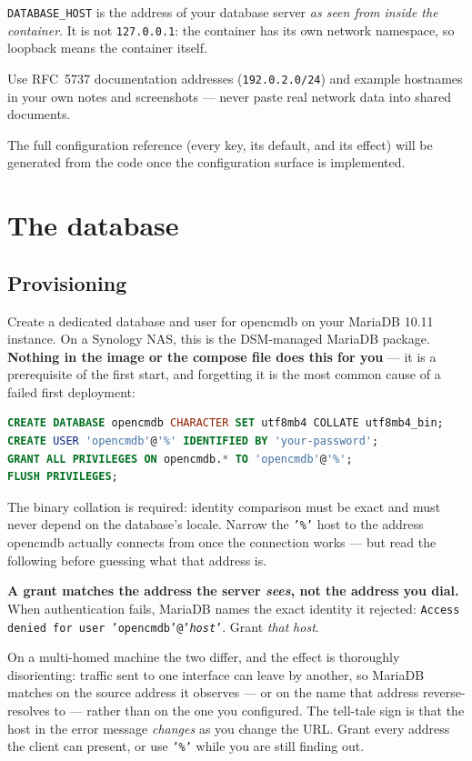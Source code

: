 \documentclass[11pt,oneside,listof=totoc,bibliography=totoc]{scrreprt}
\begin{document}
\begin{warning}
\texttt{DATABASE\_HOST} is the address of your database server \emph{as seen from inside the
container}. It is not \texttt{127.0.0.1}: the container has its own network namespace, so
loopback means the container itself.
\end{warning}

\begin{note}
Use RFC~5737 documentation addresses (\texttt{192.0.2.0/24}) and example hostnames in your
own notes and screenshots — never paste real network data into shared documents.
\end{note}

\begin{planned}
The full configuration reference (every key, its default, and its effect) will be generated
from the code once the configuration surface is implemented.
\end{planned}

\chapter{The database}
\section{Provisioning}
Create a dedicated database and user for opencmdb on your MariaDB 10.11 instance. On a
Synology NAS, this is the DSM-managed MariaDB package. \textbf{Nothing in the image or the
compose file does this for you} --- it is a prerequisite of the first start, and forgetting it
is the most common cause of a failed first deployment:

\begin{lstlisting}[language=sql]
CREATE DATABASE opencmdb CHARACTER SET utf8mb4 COLLATE utf8mb4_bin;
CREATE USER 'opencmdb'@'%' IDENTIFIED BY 'your-password';
GRANT ALL PRIVILEGES ON opencmdb.* TO 'opencmdb'@'%';
FLUSH PRIVILEGES;
\end{lstlisting}

The binary collation is required: identity comparison must be exact and must never depend on
the database's locale. Narrow the \texttt{'\%'} host to the address opencmdb actually connects
from once the connection works --- but read the following before guessing what that address is.

\begin{warning}
\textbf{A grant matches the address the server \emph{sees}, not the address you dial.} When
authentication fails, MariaDB names the exact identity it rejected:
\texttt{Access denied for user 'opencmdb'@'\textit{host}'}. Grant \emph{that} \textit{host}.

On a multi-homed machine the two differ, and the effect is thoroughly disorienting: traffic sent
to one interface can leave by another, so MariaDB matches on the source address it observes ---
or on the name that address reverse-resolves to --- rather than on the one you configured. The
tell-tale sign is that the host in the error message \emph{changes} as you change the URL. Grant
every address the client can present, or use \texttt{'\%'} while you are still finding out.
\end{warning}
\end{document}
